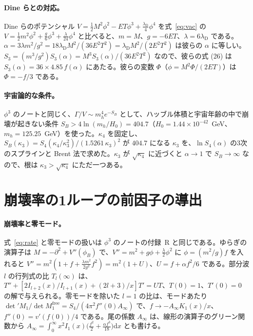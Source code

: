 \documentclass[a4paper,10pt]{ltjsarticle}
\newcommand{\dd}{\mathrm{d}}
\begin{document}
\paragraph{Dine らとの対応。}Dine らのポテンシャル $V=\frac12M^2\phi^2-ET\phi^3+\frac{\lambda_{\mathrm D}}4\phi^4$ を式~\eqref{eq:vac} の $V=\frac12m^2\phi^2+\frac g6\phi^3+\frac\lambda{24}\phi^4$ と比べると、$m=M$、$g=-6ET$、$\lambda=6\lambda_{\mathrm D}$ である。$\alpha=3\lambda m^2/g^2=18\lambda_{\mathrm D}M^2/(36E^2T^2)=\lambda_{\mathrm D}M^2/(2E^2T^2)$ は彼らの $\alpha$ に等しい。$S_3=(m^3/g^2)S_3(\alpha)=M^3S_3(\alpha)/(36E^2T^2)$ なので、彼らの式 (26) は $S_3(\alpha)=36\times4.85\,f(\alpha)$ にあたる。彼らの変数 $\Phi$（$\phi=M^2\Phi/(2ET)$）は $\Phi=-f/3$ である。

\paragraph{宇宙論的な条件。}$\phi^3$ のノートと同じく、$\Gamma/V\sim m_h^4e^{-S_B}$ として、ハッブル体積と宇宙年齢の中で崩壊が起きない条件 $S_B>4\ln(m_h/H_0)=404.7$（$H_0=1.44\times10^{-42}$~GeV、$m_h=125.25$~GeV）を使った。$\kappa_4$ を固定し、$S_B(\kappa_3)=S_4(\kappa_4/\kappa_3^2)/(1.5261\,\kappa_3)^2$ が $404.7$ になる $\kappa_3$ を、$\ln S_4(\alpha)$ の3次のスプラインと Brent 法で求めた。$\kappa_3$ が $\sqrt{\kappa_4}$ に近づくと $\alpha\to1$ で $S_B\to\infty$ なので、根は $\kappa_3>\sqrt{\kappa_4}$ にただ一つある。

\section{崩壊率の1ループの前因子の導出}\label{app:prefactor}

\paragraph{崩壊率と零モード。}式~\eqref{eq:rate} と零モードの扱いは $\phi^3$ のノートの付録~R と同じである。ゆらぎの演算子は $M=-\partial^2+V''(\phi_B)$ で、$V''=m^2+g\phi+\frac\lambda2\phi^2$ に $\phi=(m^2/g)f$ を入れると $V''=m^2(1+f+\frac{\lambda m^2}{2g^2}f^2)=m^2(1+U)$、$U=f+\alpha f^2/6$ である。部分波 $l$ の行列式の比 $T_l(\infty)$ は、$T''+[2I_{l+2}(x)/I_{l+1}(x)+(2l+3)/x]T'=UT$、$T(0)=1$、$T'(0)=0$ の解で与えられる。零モードを除いた $l=1$ の比は、モードあたり $\det'M_1/\det M_1^{\mathrm{free}}=S_4/(4\pi^2f''(0)A_\infty)$ で、$f\to-A_\infty K_1(x)/x$、$f''(0)=v'(f(0))/4$ である。尾の係数 $A_\infty$ は、線形の演算子のグリーン関数から $A_\infty=\int_0^\infty x^2I_1(x)\bigl(\frac{f^2}2+\frac{\alpha f^3}{18}\bigr)\dd x$ とも書ける。
\end{document}
